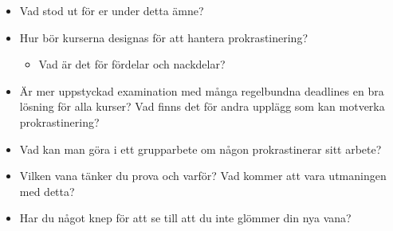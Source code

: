 \mode*

\begin{frame}
  \begin{question}
    \begin{itemize}
      \item Vad stod ut för er under detta ämne?
    \end{itemize}
  \end{question}
\end{frame}

\begin{frame}[fragile]
  \begin{question}
    \begin{itemize}
      \item Hur bör kurserna designas för att hantera prokrastinering?
        \begin{itemize}
          \item Vad är det för fördelar och nackdelar?
        \end{itemize}
    \end{itemize}
  \end{question}
\end{frame}

\begin{frame}
  \begin{question}
    \begin{itemize}
      \item Är mer uppstyckad examination med många regelbundna deadlines en 
        bra lösning för alla kurser? Vad finns det för andra upplägg som kan 
        motverka prokrastinering?
    \end{itemize}
  \end{question}
\end{frame}

\begin{frame}
  \begin{question}
    \begin{itemize}
      \item Vad kan man göra i ett grupparbete om någon prokrastinerar sitt 
        arbete?
    \end{itemize}
  \end{question}
\end{frame}

\begin{frame}
  \begin{question}
    \begin{itemize}
      \item Vilken vana tänker du prova och varför? Vad kommer att vara 
        utmaningen med detta?
      \item Har du något knep för att se till att du inte glömmer din nya vana?
    \end{itemize}
  \end{question}
\end{frame}

